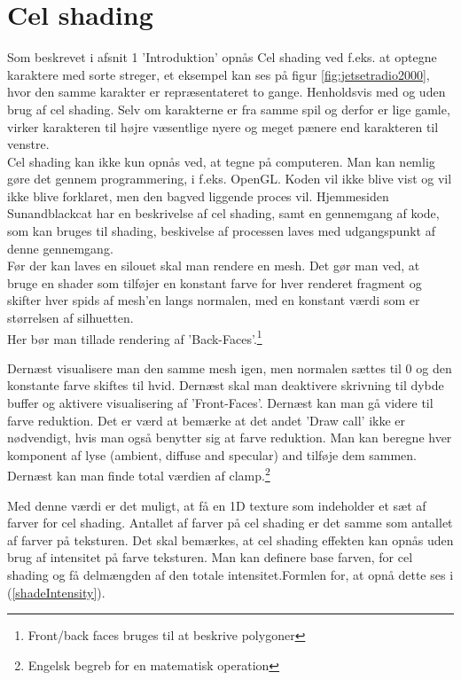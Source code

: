 \section{Cel shading}
Som beskrevet i afsnit 1 'Introduktion' opnås Cel shading ved f.eks. at optegne karaktere med sorte streger, et eksempel kan ses på figur \ref{fig:jetsetradio2000}, hvor den samme karakter er repræsentateret to gange. Henholdsvis med og uden brug af cel shading. Selv om karakterne er fra samme spil og derfor er lige gamle, virker karakteren til højre væsentlige nyere og meget pænere end karakteren til venstre. 
\\
Cel shading kan ikke kun opnås ved, at tegne på computeren. Man kan nemlig gøre det gennem programmering, i f.eks. OpenGL. Koden vil ikke blive vist og vil ikke blive forklaret, men den bagved liggende proces vil. Hjemmesiden Sunandblackcat \cite{sunandblackcat2016} har en beskrivelse af cel shading, samt en gennemgang af kode, som kan bruges til shading, beskivelse af processen laves med udgangspunkt af denne gennemgang.
\\
Før der kan laves en silouet skal man rendere en mesh. Det gør man ved, at bruge en shader som tilføjer en konstant farve for hver renderet fragment og skifter hver spids af mesh’en langs normalen, med en konstant værdi som er størrelsen af silhuetten.
\\ Her bør man tillade rendering af ’Back-Faces’.\footnote[1]{Front/back faces bruges til at beskrive polygoner}

Dernæst visualisere man den samme mesh igen, men normalen sættes til 0 og den konstante farve skiftes til hvid.  Dernæst skal man deaktivere skrivning til dybde buffer og aktivere visualisering af ’Front-Faces’. Dernæst kan man gå videre til farve reduktion. Det er værd at bemærke at det andet ’Draw call’ ikke er nødvendigt, hvis man også benytter sig at farve reduktion. 
Man kan beregne hver komponent af lyse (ambient, diffuse and specular) and tilføje dem sammen. Dernæst kan man finde total værdien af clamp.\footnote[2]{Engelsk begreb for en matematisk operation}

Med denne værdi er det muligt, at få en 1D texture som indeholder et sæt af farver for cel shading. Antallet af farver på cel shading er det samme som antallet af farver på teksturen. Det skal bemærkes, at cel shading effekten kan opnås uden brug af intensitet på farve teksturen. 
Man kan definere base farven, for cel shading og få delmængden af den totale intensitet.Formlen for, at opnå dette ses i (\ref{shadeIntensity}). 
 
